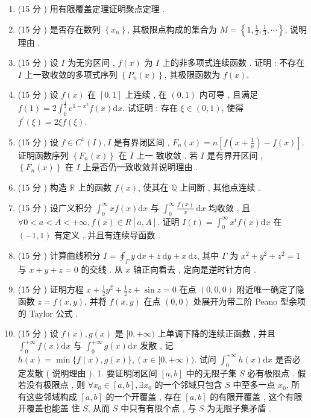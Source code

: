 \documentclass[10pt]{article}
\begin{document}
\begin{enumerate}
  \item (15  分 )  用有限覆盖定理证明聚点定理 .

  \item (15  分 )  是否存在数列  $\left\{x_{n}\right\}$,  其极限点构成的集合为  $M=\left\{1, \frac{1}{2}, \frac{1}{3}, \cdots\right\}$,  说明理由 .

  \item (15  分 )  设  $I$  为无穷区间 , $f(x)$  为  $I$  上的非多项式连续函数 .  证明 :  不存在  $I$  上一致收敛的多项式序列  $\left\{P_{n}(x)\right\}$,  其极限函数为  $f(x)$.

  \item (15  分 )  设  $f(x)$  在  $[0,1]$  上连续 ,  在  $(0,1)$  内可导 ,  且满足  $f(1)=2 \int_{0}^{\frac{1}{2}} e^{1-x^{2}} f(x) \mathrm{d} x$.  试证明 :  存在  $\xi \in(0,1)$,  使得  $f^{\prime}(\xi)=2 \xi f(\xi)$.

  \item (15  分 )  设  $f \in C^{1}(I), I$  是有界闭区间 , $F_{n}(x)=n\left[f\left(x+\frac{1}{n}\right)-f(x)\right]$.  证明函数序列  $\left\{F_{n}(x)\right\}$  在  $I$  上一   致收敛 .  若  $I$  是有界开区间 , $\left\{F_{n}(x)\right\}$  在  $I$  上是否仍一致收敛并说明理由 .

  \item (15  分 )  构造  $\mathbb{R}$  上的函数  $f(x)$,  使其在  $\mathbb{Q}$  上间断 ,  其他点连续 .

  \item (15  分 )  设广义积分  $\int_{0}^{\infty} x f(x) \mathrm{d} x$  与  $\int_{0}^{\infty} \frac{f(x)}{x} \mathrm{~d} x$  均收敛 ,  且  $\forall 0<a<A<+\infty, f(x) \in R[a, A]$.  证明  $I(t)=\int_{0}^{\infty} x^{t} f(x) \mathrm{d} x$  在  $(-1,1)$  有定义 ,  并且有连续导函数 .

  \item (15  分 )  计算曲线积分  $I=\oint_{\Gamma} y \mathrm{~d} x+z \mathrm{~d} y+x \mathrm{~d} z$,  其中  $\Gamma$  为  $x^{2}+y^{2}+z^{2}=1$  与  $x+y+z=0$  的交线 .  从  $x$  轴正向看去 ,  定向是逆时针方向 .

  \item (15  分 )  证明方程  $x+\frac{1}{2} y^{2}+\frac{1}{2} z+\sin z=0$  在点  $(0,0,0)$  附近唯一确定了隐函数  $z=f(x, y)$,  并将  $f(x, y)$  在点  $(0,0)$  处展开为带二阶  Peano  型余项的  Taylor  公式 .

  \item (15  分 )  设  $f(x), g(x)$  是  $[0,+\infty)$  上单调下降的连续正函数 ,  并且  $\int_{0}^{+\infty} f(x) \mathrm{d} x$  与  $\int_{0}^{+\infty} g(x) \mathrm{d} x$  发散 ,  记  $h(x)=\min \{f(x), g(x)\},(x \in[0,+\infty)) .$  试问  $\int_{0}^{+\infty} h(x) \mathrm{d} x$  是否必定发散  ( 说明理由 ). 1.  要证明闭区间  $[a, b]$  中的无限子集  $S$  必有极限点 .  假若没有极限点 ,  则  $\forall x_{0} \in[a, b], \exists x_{0}$  的一个邻域只包含  $S$  中至多一点  $x_{0}$,  所有这些邻域构成  $[a, b]$  的一个开覆盖 ,  存在  $[a, b]$  的有限开覆盖 ,  这个有限开覆盖也能盖   住  $S$,  从而  $S$  中只有有限个点 ,  与  $S$  为无限子集矛盾 .


\end{enumerate}
\end{document}

